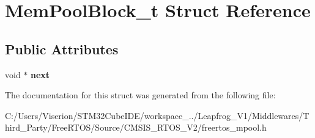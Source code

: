 \hypertarget{struct_mem_pool_block__t}{}\section{Mem\+Pool\+Block\+\_\+t Struct Reference}
\label{struct_mem_pool_block__t}
\subsection*{Public Attributes}
\begin{DoxyCompactItemize}
\item 
\mbox{\label{struct_mem_pool_block__t_a7e9f4311c39574495a7f9a309d5c70b5}} 
void $\ast$ {\bfseries next}
\end{DoxyCompactItemize}


The documentation for this struct was generated from the following file\+:\begin{DoxyCompactItemize}
\item 
C\+:/\+Users/\+Viserion/\+S\+T\+M32\+Cube\+I\+D\+E/workspace\+\_../\+Leapfrog\+\_\+\+V1/\+Middlewares/\+Third\+\_\+\+Party/\+Free\+R\+T\+O\+S/\+Source/\+C\+M\+S\+I\+S\+\_\+\+R\+T\+O\+S\+\_\+\+V2/freertos\+\_\+mpool.\+h\end{DoxyCompactItemize}
